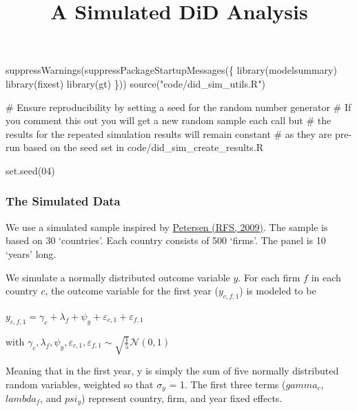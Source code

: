\documentclass[
  letterpaper,
  DIV=11,
  numbers=noendperiod]{scrartcl}
\title{A Simulated DiD Analysis}
\author{}
\date{}
\newenvironment{Shaded}{\begin{snugshade}}{\end{snugshade}}
\newcommand{\CommentTok}[1]{\textcolor[rgb]{0.37,0.37,0.37}{#1}}
\newcommand{\DecValTok}[1]{\textcolor[rgb]{0.68,0.00,0.00}{#1}}
\newcommand{\FunctionTok}[1]{\textcolor[rgb]{0.28,0.35,0.67}{#1}}
\newcommand{\NormalTok}[1]{\textcolor[rgb]{0.00,0.23,0.31}{#1}}
\newcommand{\StringTok}[1]{\textcolor[rgb]{0.13,0.47,0.30}{#1}}
\begin{document}
\maketitle


\begin{Shaded}
\begin{Highlighting}[]
\FunctionTok{suppressWarnings}\NormalTok{(}\FunctionTok{suppressPackageStartupMessages}\NormalTok{(\{}
    \FunctionTok{library}\NormalTok{(modelsummary)}
    \FunctionTok{library}\NormalTok{(fixest)}
    \FunctionTok{library}\NormalTok{(gt)}
\NormalTok{\}))}
\FunctionTok{source}\NormalTok{(}\StringTok{"code/did\_sim\_utils.R"}\NormalTok{)}

\CommentTok{\# Ensure reproducibility by setting a seed for the random number generator}
\CommentTok{\# If you comment this out you will get a new random sample each call but}
\CommentTok{\# the results for the repeated simulation results will remain constant}
\CommentTok{\# as they are pre{-}run based on the seed set in \textasciigrave{}code/did\_sim\_create\_results.R\textasciigrave{}}

\FunctionTok{set.seed}\NormalTok{(}\DecValTok{04}\NormalTok{)}
\end{Highlighting}
\end{Shaded}

\subsubsection{The Simulated Data}\label{the-simulated-data}

We use a simulated sample inspired by
\href{https://doi.org/10.1093/rfs/hhn053}{Petersen (RFS, 2009)}. The
sample is based on 30 `countries'. Each country consists of 500 `firms'.
The panel is 10 `years' long.

We simulate a normally distributed outcome variable \(y\). For each firm
\(f\) in each country \(c\), the outcome variable for the first year
(\(y_{c,f,1}\)) is modeled to be

\(y_{c,f,1} = \gamma_c + \lambda_f + \psi_y + \varepsilon_{c,1} + \varepsilon_{f,1}\)

with
\(\gamma_c, \lambda_f, \psi_y, \varepsilon_{c,1}, \varepsilon_{f,1} \sim \sqrt{\frac{1}{5}}\mathcal{N}(0,1)\)

Meaning that in the first year, y is simply the sum of five normally
distributed random variables, weighted so that \(\sigma_y\) = 1. The
first three terms (\(gamma_c\), \(lambda_f\), and \(psi_y\)) represent
country, firm, and year fixed effects.
\end{document}
